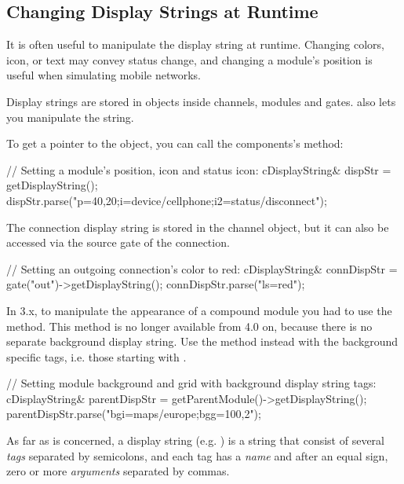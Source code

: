 \subsection{Changing Display Strings at Runtime}

It is often useful to manipulate the display string at runtime.
Changing colors, icon, or text may convey status change, and
changing a module's position is useful when simulating mobile
networks.

Display strings are stored in  objects inside
channels, modules and gates.  also lets you
manipulate the string.

To get a pointer to the  object, you can call
the components's  method:

\begin{cpp}
// Setting a module's position, icon and status icon:
cDisplayString& dispStr = getDisplayString();
dispStr.parse("p=40,20;i=device/cellphone;i2=status/disconnect");
\end{cpp}

\begin{note}
The connection display string is stored in the channel object, but it
can also be accessed via the source gate of the connection.
\end{note}

\begin{cpp}
// Setting an outgoing connection's color to red:
cDisplayString& connDispStr = gate("out")->getDisplayString();
connDispStr.parse("ls=red");
\end{cpp}

\begin{note}
In {\opp} 3.x, to manipulate the appearance of a compound module you had to use
the  method. This method is no longer
available from {\opp} 4.0 on, because there is no separate background display string.
Use the  method instead with the background
specific tags, i.e. those starting with .
\end{note}

\begin{cpp}
// Setting module background and grid with background display string tags:
cDisplayString& parentDispStr = getParentModule()->getDisplayString();
parentDispStr.parse("bgi=maps/europe;bgg=100,2");
\end{cpp}

As far as  is concerned, a display string
(e.g. ) is a string that consist of several
\textit{tags} separated by semicolons, and each tag has a \textit{name}
and after an equal sign, zero or more \textit{arguments} separated by commas.

